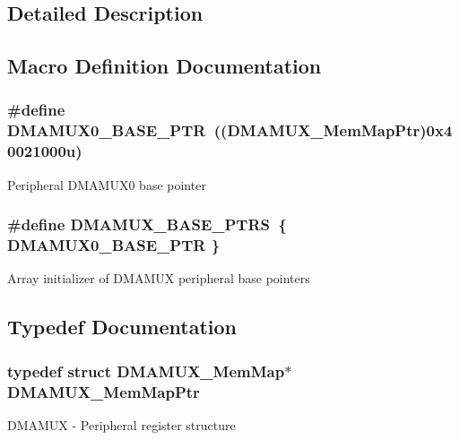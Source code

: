 \subsection{Detailed Description}


\subsection{Macro Definition Documentation}
\hypertarget{group___d_m_a_m_u_x___peripheral_ga403b61d306820e4e1113c636300004a3}{}
\subsubsection[{D\+M\+A\+M\+U\+X0\+\_\+\+B\+A\+S\+E\+\_\+\+P\+T\+R}]{\setlength{\rightskip}{0pt plus 5cm}\#define D\+M\+A\+M\+U\+X0\+\_\+\+B\+A\+S\+E\+\_\+\+P\+T\+R~(({\bf D\+M\+A\+M\+U\+X\+\_\+\+Mem\+Map\+Ptr})0x40021000u)}\label{group___d_m_a_m_u_x___peripheral_ga403b61d306820e4e1113c636300004a3}
Peripheral D\+M\+A\+M\+U\+X0 base pointer \hypertarget{group___d_m_a_m_u_x___peripheral_gaad218c12978071501dc2899f0624de4b}{}
\subsubsection[{D\+M\+A\+M\+U\+X\+\_\+\+B\+A\+S\+E\+\_\+\+P\+T\+R\+S}]{\setlength{\rightskip}{0pt plus 5cm}\#define D\+M\+A\+M\+U\+X\+\_\+\+B\+A\+S\+E\+\_\+\+P\+T\+R\+S~\{ {\bf D\+M\+A\+M\+U\+X0\+\_\+\+B\+A\+S\+E\+\_\+\+P\+T\+R} \}}\label{group___d_m_a_m_u_x___peripheral_gaad218c12978071501dc2899f0624de4b}
Array initializer of D\+M\+A\+M\+U\+X peripheral base pointers 

\subsection{Typedef Documentation}
\hypertarget{group___d_m_a_m_u_x___peripheral_ga736ab5b1ed284b3b4fdb63010a576777}{}
\subsubsection[{D\+M\+A\+M\+U\+X\+\_\+\+Mem\+Map\+Ptr}]{\setlength{\rightskip}{0pt plus 5cm}typedef struct {\bf D\+M\+A\+M\+U\+X\+\_\+\+Mem\+Map}$\ast$ {\bf D\+M\+A\+M\+U\+X\+\_\+\+Mem\+Map\+Ptr}}\label{group___d_m_a_m_u_x___peripheral_ga736ab5b1ed284b3b4fdb63010a576777}
D\+M\+A\+M\+U\+X -\/ Peripheral register structure 